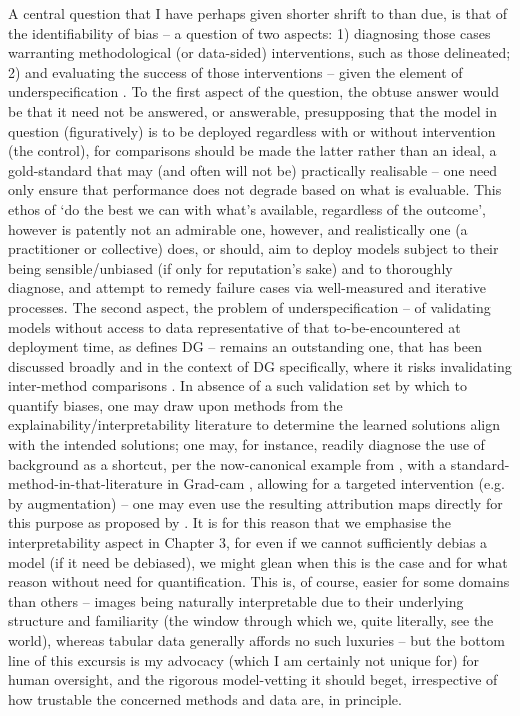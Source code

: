 %
A central question that I have perhaps given shorter shrift to than due, is that of the
identifiability of bias -- a question of two aspects: 1) diagnosing those cases warranting
methodological (or data-sided) interventions, such as those delineated; 2) and evaluating the
success of those interventions -- given the element of underspecification
\citep{semenova2019study}.
%
To the first aspect of the question, the obtuse answer would be that it need not be answered, or
answerable, presupposing that the model in question (figuratively) is to be deployed regardless
with or without intervention (the control), for comparisons should be made \wrt{} the latter rather
than \wrt{} an ideal, a gold-standard that may (and often will not be) practically realisable --
one need only ensure that performance does not degrade based on what is evaluable.
%
%
This ethos of `do the best we can with what's available, regardless of the outcome', however is
patently not an admirable one, however, and realistically one (a practitioner or collective) does,
or should, aim to deploy models subject to their being sensible/unbiased (if only for reputation's
sake) and to thoroughly diagnose, and attempt to remedy failure cases via well-measured and
iterative processes.
%
The second aspect, the problem of underspecification -- of validating models without access to data
representative of that to-be-encountered at deployment time, as defines DG -- remains an
outstanding one, that has been discussed broadly and in the context of DG specifically, where it
risks invalidating inter-method comparisons \citep{gulrajani2020search}.
%
%
In absence of a such validation set by which to quantify biases, one may draw upon methods from the
explainability/interpretability literature \citep{gunning2019xai} to determine the learned
solutions align with the intended solutions; one may, for instance, readily diagnose the use of
background as a shortcut, per the now-canonical example from \cite{beery2018recognition}, with a
standard-method-in-that-literature in Grad-cam \cite{selvaraju2017grad}, allowing for a targeted
intervention (e.g. by augmentation) -- one may even use the resulting attribution maps directly for
this purpose as proposed by \cite{taghanaki2022masktune}.
%
It is for this reason that we emphasise the interpretability aspect in Chapter 3, for even if we
cannot sufficiently debias a model (if it need be debiased), we might glean when this is the case
and for what reason without need for quantification.
%
This is, of course, easier for some domains than others -- images being naturally interpretable due
to their underlying structure and familiarity (the window through which we, quite literally, see
the world), whereas tabular data generally affords no such luxuries -- but the bottom line of this
excursis is my advocacy (which I am certainly not unique for) for human oversight, and the rigorous
model-vetting it should beget, irrespective of how trustable the concerned methods and data are, in
principle.
%

